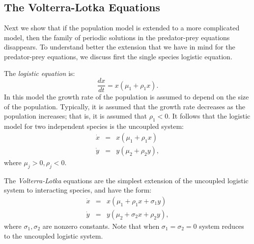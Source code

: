 \documentclass{ximera}
\begin{document}
\subsection*{The Volterra-Lotka Equations}

Next we show that if the population model  is extended to 
a more complicated model, then the family of periodic 
solutions in 
the predator-prey equations disappears.  To understand better the 
extension that we have in mind for the predator-prey equations, we 
discuss first the single species logistic equation.
 
The {\em logistic equation\/}  is:
\[
\frac{dx}{dt} = x(\mu_1 + \rho_1x).
\]
In this model the growth rate of the population is assumed to
depend on the size of the population.  Typically, it is assumed
that the growth rate decreases as the population increases; that
is, it is assumed that $\rho_1 < 0$.  It follows that the
logistic model for two independent species is the uncoupled system:
\begin{eqnarray*}
\dot{x} & = & x(\mu_1 + \rho_1x) \\
\dot{y} & = & y(\mu_2 + \rho_2y),
\end{eqnarray*}
where $\mu_j>0,\rho_j<0$.

The {\em Volterra-Lotka\/} equations 
are the simplest extension
of the uncoupled logistic system to interacting species, and
have the form:
\begin{equation} \label{e:pop2}
\begin{array}{rcl}
\dot{x} & = & x(\mu_1 +   \rho_1x + \sigma_1y) \\
\dot{y} & = & y(\mu_2 + \sigma_2x +   \rho_2y),
\end{array}
\end{equation}
where $\sigma_1,\sigma_2$ are nonzero constants.  Note that when
$\sigma_1=\sigma_2=0$ system  reduces to the
uncoupled logistic system. 
\end{document}
